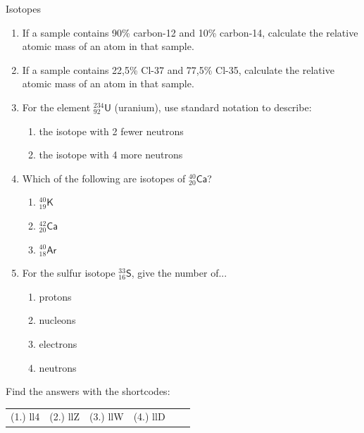 \begin{exercises}  {Isotopes }
\begin{enumerate}[noitemsep, label=\textbf{\arabic*}. ]
\item If a sample contains 90\% carbon-12 and 10\% carbon-14, calculate the relative atomic mass of an atom in that sample.
\hspace{1ex}        
\label{m38753*uid7100}\item If a sample contains 22,5\% Cl-37 and 77,5\% Cl-35, calculate the relative atomic mass of an atom in that sample.
\item For the element $^{234}_{92}{\mathsf{U}}$ (uranium), use standard notation to describe:
\begin{enumerate}[noitemsep, label=\textbf{\alph*}. ]
 \item the isotope with 2 fewer neutrons
 \item the isotope with 4 more neutrons
\end{enumerate}
\item Which of the following are isotopes of $^{40}_{20}\mathsf{Ca}$?
\begin{enumerate}[noitemsep, label=\textbf{\alph*}. ]
 \item $^{40}_{19}\mathsf{K}$
 \item $^{42}_{20}\mathsf{Ca}$
 \item $^{40}_{18}\mathsf{Ar}$
\end{enumerate}
\item For the sulfur isotope $^{33}_{16}\mathsf{S}$, give the number of...
	\begin{enumerate}[noitemsep, label=\textbf{\alph*}. ]
	\item{protons}
	\item{nucleons}
	\item{electrons}
	\item{neutrons}
	\end{enumerate}
\hspace{1ex}        
                \end{enumerate}
      \label{m38753*uid68}
\par {} Find the answers with the shortcodes:
 \par \begin{tabular}[h]{cccccc}
 (1.) ll4  &  (2.) llZ  &  (3.) llW  &  (4.) llD  & \end{tabular}

\end{exercises}

